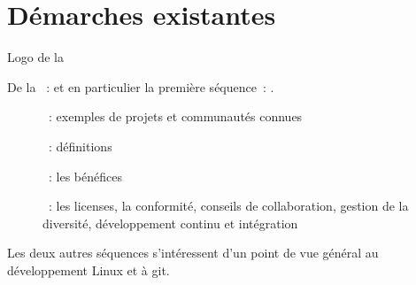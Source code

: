 \chapter{Démarches existantes}

\begin{marginfigure}
    \href{https://www.linuxfoundation.org/}{}
    \caption{Logo de la }
\end{marginfigure}

De la  :
  \href{https://www.edx.org/professional-certificate/linuxfoundationx-open-source-software-development-linux-and-git}
  {}
et en particulier la première séquence :
  \href{https://www.edx.org/course/open-source-software-development-linux-for-developers}
  {}.

\begin{description}
    \item[] : exemples de projets et communautés connues
    \item[] : définitions
    \item[] : les bénéfices
    \item[] : les licenses, la conformité, conseils de collaboration, gestion de la
        diversité, développement continu et intégration
\end{description}

Les deux autres séquences s'intéressent d'un point de vue général au développement Linux et à git.
